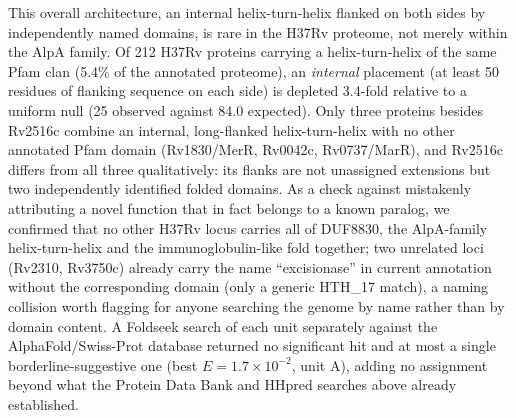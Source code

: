 \documentclass[11pt,a4paper]{article}
\begin{document}
This overall architecture, an internal helix-turn-helix flanked on both sides by independently
named domains, is rare in the H37Rv proteome, not merely within the AlpA family. Of 212 H37Rv
proteins carrying a helix-turn-helix of the same Pfam clan (5.4\% of the annotated proteome), an
\emph{internal} placement (at least 50 residues of flanking sequence on each side) is depleted
3.4-fold relative to a uniform null (25 observed against 84.0 expected). Only three proteins besides
Rv2516c combine an internal, long-flanked helix-turn-helix with no other annotated Pfam domain
(Rv1830/MerR, Rv0042c, Rv0737/MarR), and Rv2516c differs from all three qualitatively: its flanks
are not unassigned extensions but two independently identified folded domains. As a check against
mistakenly attributing a novel function that in fact belongs to a known paralog, we confirmed that
no other H37Rv locus carries all of DUF8830, the AlpA-family helix-turn-helix and the
immunoglobulin-like fold together; two unrelated loci (Rv2310, Rv3750c) already carry the name
``excisionase'' in current annotation without the corresponding domain (only a generic HTH\_17
match), a naming collision worth flagging for anyone searching the genome by name rather than by
domain content. A Foldseek search of each unit separately against the AlphaFold/Swiss-Prot database
returned no significant hit and at most a single borderline-suggestive one (best $E=1.7\times10^{-2}$,
unit A), adding no assignment beyond what the Protein Data Bank and HHpred searches above already
established.
\end{document}
